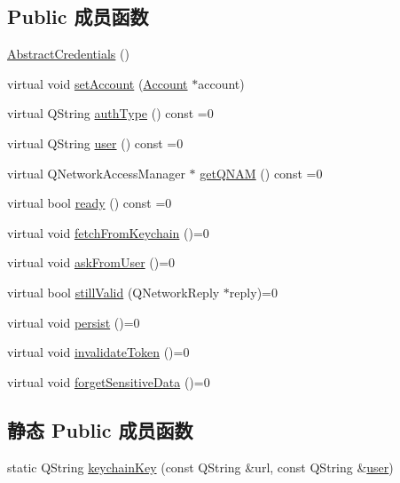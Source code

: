 \subsection*{Public 成员函数}
\begin{DoxyCompactItemize}
\item 
\hyperlink{class_o_c_c_1_1_abstract_credentials_aad7f0ecc6a9f1335be4abc5754321baf}{Abstract\+Credentials} ()
\item 
virtual void \hyperlink{class_o_c_c_1_1_abstract_credentials_a9dc52ed1c3138adc446aa24c274cf1a8}{set\+Account} (\hyperlink{class_o_c_c_1_1_account}{Account} $\ast$account)
\item 
virtual Q\+String \hyperlink{class_o_c_c_1_1_abstract_credentials_a47219fcdd7ecc614803d024c361b9c16}{auth\+Type} () const =0
\item 
virtual Q\+String \hyperlink{class_o_c_c_1_1_abstract_credentials_a8d96306a2d4af6c6dcffaa0b7c5b46f8}{user} () const =0
\item 
virtual Q\+Network\+Access\+Manager $\ast$ \hyperlink{class_o_c_c_1_1_abstract_credentials_ae5b9fd23e37129efede9b4d430ac5766}{get\+Q\+N\+AM} () const =0
\item 
virtual bool \hyperlink{class_o_c_c_1_1_abstract_credentials_a77adad4957e0365be40db7fe4499a86b}{ready} () const =0
\item 
virtual void \hyperlink{class_o_c_c_1_1_abstract_credentials_aac58b02f74811eeedb0fd944bf8a20c3}{fetch\+From\+Keychain} ()=0
\item 
virtual void \hyperlink{class_o_c_c_1_1_abstract_credentials_ade846fa97d67c4fd368e01acebd8c977}{ask\+From\+User} ()=0
\item 
virtual bool \hyperlink{class_o_c_c_1_1_abstract_credentials_a13eca92c3c27886aecd39c6912b7e225}{still\+Valid} (Q\+Network\+Reply $\ast$reply)=0
\item 
virtual void \hyperlink{class_o_c_c_1_1_abstract_credentials_ab4af03be7d9e7e330345b8f13e67a544}{persist} ()=0
\item 
virtual void \hyperlink{class_o_c_c_1_1_abstract_credentials_a9c5d9d0c3e4a8fc1ff8cf45efc2f0337}{invalidate\+Token} ()=0
\item 
virtual void \hyperlink{class_o_c_c_1_1_abstract_credentials_af8f5afe21813bd54607713342fef8448}{forget\+Sensitive\+Data} ()=0
\end{DoxyCompactItemize}
\subsection*{静态 Public 成员函数}
\begin{DoxyCompactItemize}
\item 
static Q\+String \hyperlink{class_o_c_c_1_1_abstract_credentials_abc4722b371be047160cb18a416c85c74}{keychain\+Key} (const Q\+String \&url, const Q\+String \&\hyperlink{class_o_c_c_1_1_abstract_credentials_a8d96306a2d4af6c6dcffaa0b7c5b46f8}{user})
\end{DoxyCompactItemize}
